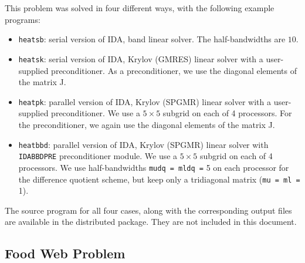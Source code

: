 \documentclass[11pt]{article}
\begin{document}
This problem was solved in four different ways, with the following
example programs:
\begin{itemize}

\item {\tt heatsb}: serial version of IDA, band linear solver. The 
half-bandwidths are $10$.

\item {\tt heatsk}: serial version of IDA, Krylov (GMRES) linear solver with 
a user-supplied preconditioner. As a preconditioner, we use the diagonal
elements of the matrix J.

\item {\tt heatpk}: parallel version of IDA, Krylov (SPGMR) linear
solver with a user-supplied preconditioner. We use a $5 \times 5$ subgrid on
each of 4 processors. For the preconditioner, we again use the diagonal 
elements of the matrix J.

\item {\tt heatbbd}: parallel version of IDA, Krylov (SPGMR) linear
solver with {\tt IDABBDPRE} preconditioner module.  We use a $5 \times 5$ 
subgrid on each of 4 processors. We use half-bandwidths 
{\tt mudq = mldq =} 5 on each processor for the difference quotient
scheme, but keep only a tridiagonal matrix ({\tt mu = ml =} 1).

\end{itemize}

The source program for all four cases, along with the corresponding
output files are available in the distributed package. They are not
included in this document.


\subsection{Food Web Problem}
\end{document}
